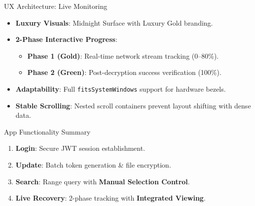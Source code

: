 \documentclass{beamer}
\begin{document}
\begin{frame}{UX Architecture: Live Monitoring}
    \begin{itemize}
        \item \textbf{Luxury Visuals}: Midnight Surface with Luxury Gold branding.
        \item \textbf{2-Phase Interactive Progress}:
            \begin{itemize}
                \item \textbf{Phase 1 (Gold)}: Real-time network stream tracking (0--80\%).
                \item \textbf{Phase 2 (Green)}: Post-decryption success verification (100\%).
            \end{itemize}
        \item \textbf{Adaptability}: Full \texttt{fitsSystemWindows} support for hardware bezels.
        \item \textbf{Stable Scrolling}: Nested scroll containers prevent layout shifting with dense data.
    \end{itemize}
\end{frame}

\begin{frame}{App Functionality Summary}
    \begin{enumerate}
        \item \textbf{Login}: Secure JWT session establishment.
        \item \textbf{Update}: Batch token generation \& file encryption.
        \item \textbf{Search}: Range query with \textbf{Manual Selection Control}.
        \item \textbf{Live Recovery}: 2-phase tracking with \textbf{Integrated Viewing}.
    \end{enumerate}
\end{frame}
\end{document}
